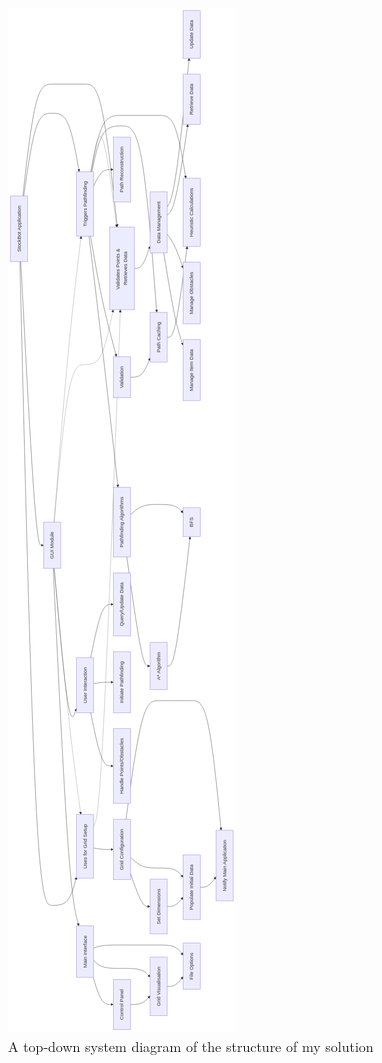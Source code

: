\begin{figure}[!htbp]
\begin{minipage}{0.27\textwidth}
		\includegraphics[width=\linewidth]{Images/top-down-diagram.png}
		\caption{A top-down system diagram of the structure of my solution}
		\label{fig:topdown} %
	\end{minipage}
	
	
\end{figure}


